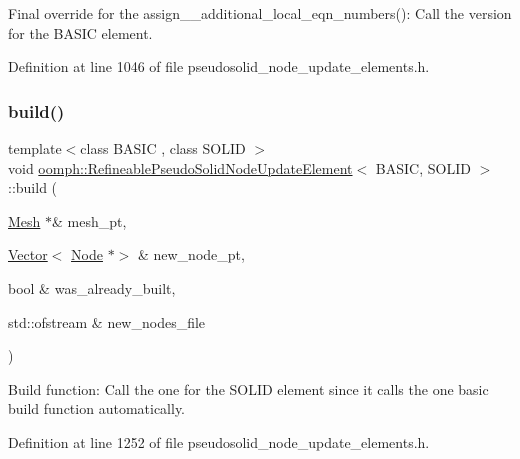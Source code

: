 Final override for the assign\+\_\+\+\_\+additional\+\_\+local\+\_\+eqn\+\_\+numbers()\+: Call the version for the B\+A\+S\+IC element. 



Definition at line 1046 of file pseudosolid\+\_\+node\+\_\+update\+\_\+elements.\+h.

\mbox{\label{classoomph_1_1RefineablePseudoSolidNodeUpdateElement_a22243bff26e96b0ea8f0f8361d48c067}} 
\subsubsection{\texorpdfstring{build()}{build()}\hspace{0.1cm}{\footnotesize\ttfamily [1/2]}}
{\footnotesize\ttfamily template$<$class B\+A\+S\+IC , class S\+O\+L\+ID $>$ \\
void \hyperlink{classoomph_1_1RefineablePseudoSolidNodeUpdateElement}{oomph\+::\+Refineable\+Pseudo\+Solid\+Node\+Update\+Element}$<$ B\+A\+S\+IC, S\+O\+L\+ID $>$\+::build (\begin{DoxyParamCaption}\item[{\hyperlink{classoomph_1_1Mesh}{Mesh} $\ast$\&}]{mesh\+\_\+pt,  }\item[{\hyperlink{classoomph_1_1Vector}{Vector}$<$ \hyperlink{classoomph_1_1Node}{Node} $\ast$$>$ \&}]{new\+\_\+node\+\_\+pt,  }\item[{bool \&}]{was\+\_\+already\+\_\+built,  }\item[{std\+::ofstream \&}]{new\+\_\+nodes\+\_\+file }\end{DoxyParamCaption})\hspace{0.3cm}{\ttfamily [inline]}}



Build function\+: Call the one for the S\+O\+L\+ID element since it calls the one basic build function automatically. 



Definition at line 1252 of file pseudosolid\+\_\+node\+\_\+update\+\_\+elements.\+h.

\mbox{\label{classoomph_1_1RefineablePseudoSolidNodeUpdateElement_af338d321bac822a2a8abbf0019791d4a}} 
